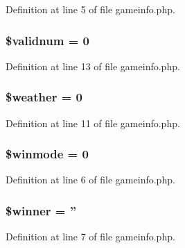 Definition at line 5 of file gameinfo.\+php.

\hypertarget{install_2gameinfo_8php_a54f1a166645794ce06e05051071a0d53}{
\subsubsection[{\$validnum}]{\setlength{\rightskip}{0pt plus 5cm}\$validnum = 0}}\label{install_2gameinfo_8php_a54f1a166645794ce06e05051071a0d53}


Definition at line 13 of file gameinfo.\+php.

\hypertarget{install_2gameinfo_8php_a7c88c8dfcf14e98d581073a25966ec09}{
\subsubsection[{\$weather}]{\setlength{\rightskip}{0pt plus 5cm}\$weather = 0}}\label{install_2gameinfo_8php_a7c88c8dfcf14e98d581073a25966ec09}


Definition at line 11 of file gameinfo.\+php.

\hypertarget{install_2gameinfo_8php_afe89a6c5b88f243cfb7699a60ed3e0f3}{
\subsubsection[{\$winmode}]{\setlength{\rightskip}{0pt plus 5cm}\$winmode = 0}}\label{install_2gameinfo_8php_afe89a6c5b88f243cfb7699a60ed3e0f3}


Definition at line 6 of file gameinfo.\+php.

\hypertarget{install_2gameinfo_8php_ad92744668d7f5e7b2ee5b87fe8a845f2}{
\subsubsection[{\$winner}]{\setlength{\rightskip}{0pt plus 5cm}\$winner = ''}}\label{install_2gameinfo_8php_ad92744668d7f5e7b2ee5b87fe8a845f2}


Definition at line 7 of file gameinfo.\+php.

